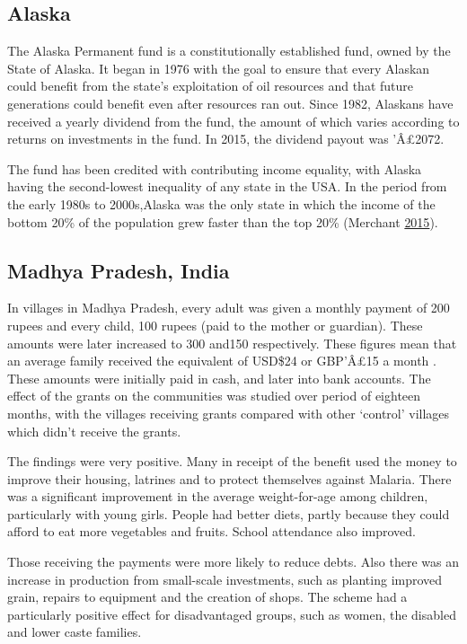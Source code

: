 \documentclass[]{tufte-handout}
\begin{document}
\hypertarget{alaska}{%
\subsection{Alaska}\label{alaska}}

The Alaska Permanent fund is a constitutionally established fund, owned
by the State of Alaska. It began in 1976 with the goal to ensure that
every Alaskan could benefit from the state's exploitation of oil
resources and that future generations could benefit even after resources
ran out. Since 1982, Alaskans have received a yearly dividend from the
fund, the amount of which varies according to returns on investments in
the fund. In 2015, the dividend payout was 'Â£2072.

The fund has been credited with contributing income equality, with
Alaska having the second-lowest inequality of any state in the USA. In
the period from the early 1980s to 2000s,Alaska was the only state in
which the income of the bottom 20\% of the population grew faster than
the top 20\% (Merchant \protect\hyperlink{ref-BrianMerchant2015}{2015}).

\hypertarget{madhya-pradesh-india}{%
\subsection{Madhya Pradesh, India}\label{madhya-pradesh-india}}

In villages in Madhya Pradesh, every adult was given a monthly payment
of 200 rupees and every child, 100 rupees (paid to the mother or
guardian). These amounts were later increased to 300 and150
respectively. These figures mean that an average family received the
equivalent of USD\$24 or GBP'Â£15 a month . These amounts were initially
paid in cash, and later into bank accounts. The effect of the grants on
the communities was studied over period of eighteen months, with the
villages receiving grants compared with other `control' villages which
didn't receive the grants.

The findings were very positive. Many in receipt of the benefit used the
money to improve their housing, latrines and to protect themselves
against Malaria. There was a significant improvement in the average
weight-for-age among children, particularly with young girls. People had
better diets, partly because they could afford to eat more vegetables
and fruits. School attendance also improved.

Those receiving the payments were more likely to reduce debts. Also
there was an increase in production from small-scale investments, such
as planting improved grain, repairs to equipment and the creation of
shops. The scheme had a particularly positive effect for disadvantaged
groups, such as women, the disabled and lower caste families.
\end{document}
